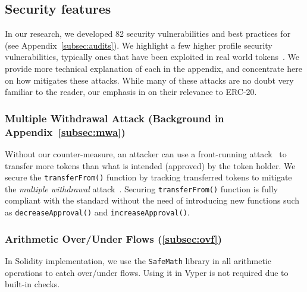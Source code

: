 

\subsection{Security features}
In our research, we developed 82 security vulnerabilities and best practices for \erc (see Appendix~\ref{subsec:audits}).  We highlight a few higher profile security vulnerabilities, typically ones that have been exploited in real world \erc tokens~\cite{SolidtySecBlog,EthSecServ,SoliditySecCon,ConsensysSecCon,LandoKL}. We provide more technical explanation of each in the appendix, and concentrate here on how \sys mitigates these attacks. While many of these attacks are no doubt very familiar to the reader, our emphasis in on their relevance to ERC-20.

\subsubsection{Multiple Withdrawal Attack (Background in Appendix~\ref{subsec:mwa})}
Without our counter-measure, an attacker can use a front-running attack~\cite{OrderingAttack,eskandari2019sok} to transfer more tokens than what is intended (approved) by the token holder. We secure the \texttt{transferFrom()} function by tracking transferred tokens to mitigate the \textit{multiple withdrawal} attack~\cite{ERC20MWA}. Securing \texttt{transferFrom()} function is fully compliant with the \erc standard without the need of introducing new functions such as \texttt{decreaseApproval()} and \texttt{increaseApproval()}. 

\subsubsection{Arithmetic Over/Under Flows (\ref{subsec:ovf})} 
In Solidity implementation, we use the \texttt{SafeMath} library in all arithmetic operations to catch over/under flows. Using it in Vyper is not required due to built-in checks.

